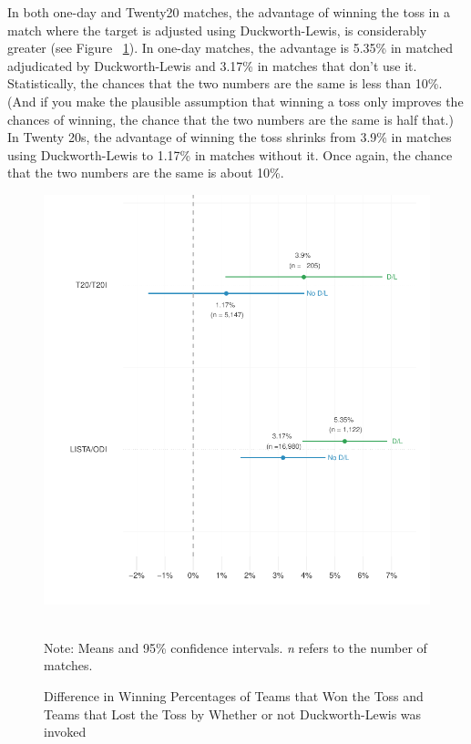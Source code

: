 \documentclass[12pt]{article}
\begin{document}
In both one-day and Twenty20 matches, the advantage of winning the toss in a match where the target is adjusted using Duckworth-Lewis, is considerably greater (see Figure ~\ref{fig:dl}). In one-day matches, the advantage is 5.35\% in matched adjudicated by Duckworth-Lewis and 3.17\% in matches that don't use it. Statistically, the chances that the two numbers are the same is less than 10\%. (And if you make the plausible assumption that winning a toss only improves the chances of winning, the chance that the two numbers are the same is half that.) In Twenty 20s, the advantage of winning the toss shrinks from 3.9\% in matches using Duckworth-Lewis to 1.17\% in matches without it. Once again, the chance that the two numbers are the same is about 10\%. 

\begin{figure}[htbp]
\centering
\caption{Difference in Winning Percentages of Teams that Won the Toss and Teams that Lost the Toss by Whether or not Duckworth-Lewis was invoked}
\includegraphics[scale=1]{../figs/winbyDL.pdf}
{\footnotesize \\ Note: Means and 95\% confidence intervals. \emph{n} refers to the number of matches.\par}
\label{fig:dl}
\end{figure}
\end{document}
